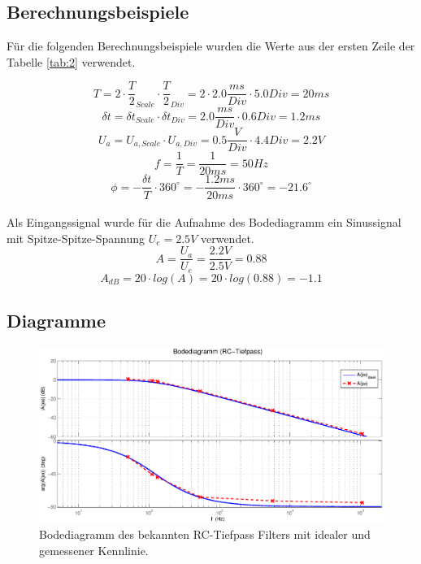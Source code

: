 \documentclass[12pt,a4paper,ngerman]{article}
\begin{document}
\subsection{Berechnungsbeispiele}
Für die folgenden Berechnungsbeispiele wurden die Werte aus der ersten Zeile der Tabelle \ref{tab:2} verwendet.

\begin{equation}
T = 2 \cdot \frac{T}{2}_{Scale} \cdot \frac{T}{2}_{Div} = 2 \cdot 2.0\frac{ms}{Div} \cdot 5.0 Div = 20ms
\end{equation}
\begin{equation}
\delta t = \delta t_{Scale} \cdot \delta t_{Div} = 2.0\frac{ms}{Div} \cdot 0.6Div = 1.2ms
\end{equation}
\begin{equation}
U_a = U_{a,Scale} \cdot U_{a,Div} = 0.5\frac{V}{Div} \cdot 4.4Div = 2.2V
\end{equation}
\begin{equation}
f = \frac{1}{T} = \frac{1}{20ms} = 50Hz
\end{equation}
\begin{equation}
\phi = - \frac{\delta t}{T} \cdot 360^\circ = -\frac{1.2ms}{20ms	} \cdot 360^\circ = -21.6^\circ
\end{equation}\\
Als Eingangssignal wurde für die Aufnahme des Bodediagramm ein Sinussignal mit Spitze-Spitze-Spannung $U_e = 2.5V$ verwendet.
\begin{equation}
A = \frac{U_a}{U_e} = \frac{2.2V}{2.5V} = 0.88
\end{equation}
\begin{equation}
A_{dB} = 20 \cdot log(A) = 20 \cdot log(0.88) = -1.1
\end{equation}

\subsection{Diagramme}
\begin{figure}[H]
\centering
\includegraphics[width=\textwidth]{figures/bode_rc.eps} 
\caption{Bodediagramm des bekannten RC-Tiefpass Filters mit idealer und gemessener Kennlinie.}
\label{fig:bode_bek}
\end{figure}
\end{document}
